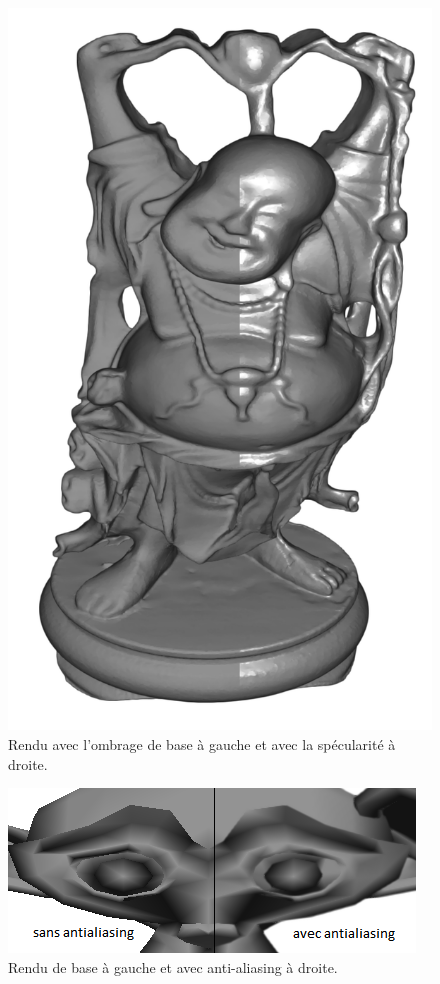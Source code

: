 \begin{figure}[h!]
	\centering
	\includegraphics[scale=0.18]{images/rendu_specular.png}
	\caption{\label{fig:screenSpecular.png} Rendu avec l'ombrage de base à gauche et avec la spécularité à droite. \protect}
\end{figure}
\begin{figure}[h!]
	\centering
	\includegraphics[scale=0.5]{images/antialiasing.png}
	\caption{\label{fig:antialiasing.png} Rendu de base à gauche et avec anti-aliasing à droite. \protect}
\end{figure}


